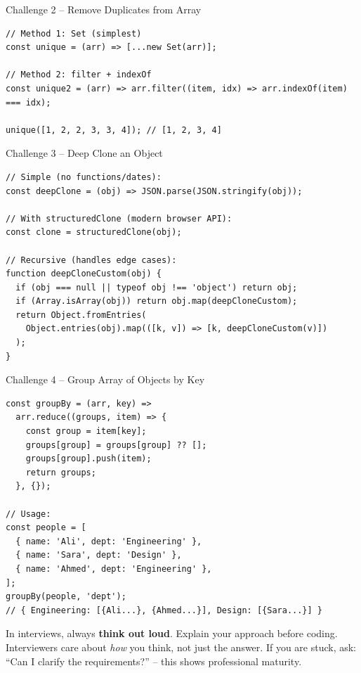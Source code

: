\documentclass[12pt,a4paper]{article}
\begin{document}
\begin{codebox}{Challenge 2 -- Remove Duplicates from Array}
\begin{lstlisting}
// Method 1: Set (simplest)
const unique = (arr) => [...new Set(arr)];

// Method 2: filter + indexOf
const unique2 = (arr) => arr.filter((item, idx) => arr.indexOf(item) === idx);

unique([1, 2, 2, 3, 3, 4]); // [1, 2, 3, 4]
\end{lstlisting}
\end{codebox}

\begin{codebox}{Challenge 3 -- Deep Clone an Object}
\begin{lstlisting}
// Simple (no functions/dates):
const deepClone = (obj) => JSON.parse(JSON.stringify(obj));

// With structuredClone (modern browser API):
const clone = structuredClone(obj);

// Recursive (handles edge cases):
function deepCloneCustom(obj) {
  if (obj === null || typeof obj !== 'object') return obj;
  if (Array.isArray(obj)) return obj.map(deepCloneCustom);
  return Object.fromEntries(
    Object.entries(obj).map(([k, v]) => [k, deepCloneCustom(v)])
  );
}
\end{lstlisting}
\end{codebox}

\begin{codebox}{Challenge 4 -- Group Array of Objects by Key}
\begin{lstlisting}
const groupBy = (arr, key) =>
  arr.reduce((groups, item) => {
    const group = item[key];
    groups[group] = groups[group] ?? [];
    groups[group].push(item);
    return groups;
  }, {});

// Usage:
const people = [
  { name: 'Ali', dept: 'Engineering' },
  { name: 'Sara', dept: 'Design' },
  { name: 'Ahmed', dept: 'Engineering' },
];
groupBy(people, 'dept');
// { Engineering: [{Ali...}, {Ahmed...}], Design: [{Sara...}] }
\end{lstlisting}
\end{codebox}

\vspace{0.5cm}
\begin{tipbox}
In interviews, always \textbf{think out loud}. Explain your approach before coding. Interviewers care about \textit{how} you think, not just the answer. If you are stuck, ask: ``Can I clarify the requirements?'' -- this shows professional maturity.
\end{tipbox}
\end{document}
